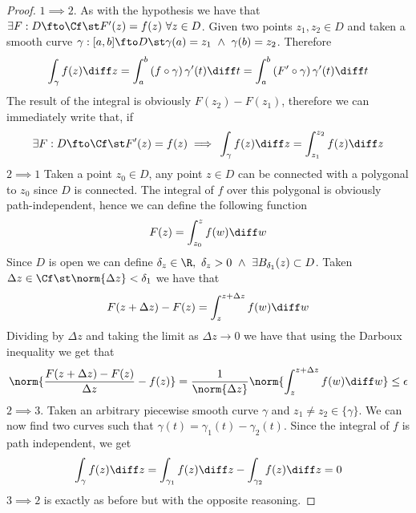 \documentclass[../mmf.tex]{subfiles}
\begin{document}
\begin{proof}
	$1\implies{}2$. As with the hypothesis we have that $\exists F:D\fto\Cf\st F'(z)=f(z)\ \forall z\in D$. Given two points $z_1,z_2\in D$ and taken a smooth curve $\gamma:[a,b]\fto D\st\gamma(a)=z_1\ \wedge\ \gamma(b)=z_2$. Therefore
	\begin{equation*}
		\int_{\gamma}^{}f(z)\diff z=\int_{a}^{b}\left( f\circ\gamma \right)\gamma'(t)\diff t=\int_{a}^{b}\left( F'\circ\gamma \right)\gamma'(t)\diff t
	\end{equation*}
	The result of the integral is obviously $F(z_2)-F(z_1)$, therefore we can immediately write that, if
	\begin{equation*}
		\exists F:D\fto\Cf\st F'(z)=f(z)\implies{}\int_{\gamma}^{}f(z)\diff z=\int_{z_1}^{z_2}f(z)\diff z
	\end{equation*}
	$2\implies{}1$ Taken a point $z_0\in D$, any point $z\in D$ can be connected with a polygonal to $z_0$ since $D$ is connected. The integral of $f$ over this polygonal is obviously path-independent, hence we can define the following function
	\begin{equation*}
		F(z)=\int_{z_0}^{z}f(w)\diff w
	\end{equation*}
	Since $D$ is open we can define $\delta_z\in\R,\ \delta_z>0\ \wedge\ \exists B_{\delta_1}(z)\subset D$. Taken $\Delta z\in\Cf\st\norm{\Delta z}<\delta_1$ we have that
	\begin{equation*}
		F(z+\Delta z)-F(z)=\int_{z}^{z+\Delta z}f(w)\diff w
	\end{equation*}
	Dividing by $\Delta z$ and taking the limit as $\Delta z\to 0$ we have that using the Darboux inequality we get that
	\begin{equation*}
		\norm{\frac{F(z+\Delta z)-F(z)}{\Delta z}-f(z)}=\frac{1}{\norm{\Delta z}}\norm{\int_{z}^{z+\Delta z}f(w)\diff w}\le\epsilon
	\end{equation*}
	$2\implies{}3$. Taken an arbitrary piecewise smooth curve $\gamma$ and $z_1\ne z_2\in\{\gamma\}$. We can now find two curves such that $\gamma(t)=\gamma_1(t)-\gamma_2(t)$. Since the integral of $f$ is path independent, we get
	\begin{equation*}
		\int_{\gamma}^{}f(z)\diff z=\int_{\gamma_1}^{}f(z)\diff z-\int_{\gamma_2}^{}f(z)\diff z=0
	\end{equation*}
	$3\implies{}2$ is exactly as before but with the opposite reasoning.
\end{proof}
\end{document}
